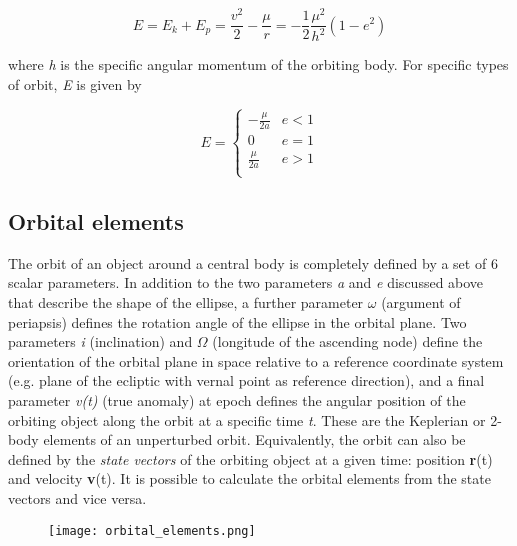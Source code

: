 \documentclass[Orbiter User Manual.tex]{subfiles}
\begin{document}
\[ E = E_{k} + E_{p} = \frac{v^{2}}{2} - \frac{\mu}{r} = - \frac{1}{2} \frac{\mu^{2}}{h^{2}}(1 - e^{2}) \]

\noindent
where \textit{h} is the specific angular momentum of the orbiting body. For specific types of orbit, \textit{E} is given by

\[ E =
\left\{
\begin{array}{ll}
	-\frac{\mu}{2a} & e < 1 \\
	0 & e = 1 \\
	\frac{\mu}{2a} & e > 1 \\
\end{array} 
\right. \]

\subsection{Orbital elements}
The orbit of an object around a central body is completely defined by a set of 6 scalar parameters. In addition to the two parameters \textit{a} and \textit{e} discussed above that describe the shape of the ellipse, a further parameter $\omega$ (argument of periapsis) defines the rotation angle of the ellipse in the orbital plane. Two parameters \textit{i} (inclination) and $\Omega$ (longitude of the ascending node) define the orientation of the orbital plane in space relative to a reference coordinate system (e.g. plane of the ecliptic with vernal point {\Aries} as reference direction), and a final parameter \textit{v(t)} (true anomaly) at epoch defines the angular position of the orbiting object along the orbit at a specific time \textit{t}. These are the Keplerian or 2-body elements of an unperturbed orbit. Equivalently, the orbit can also be defined by the \textit{state vectors} of the orbiting object at a given time: position \textbf{r}(t) and velocity \textbf{v}(t). It is possible to calculate the orbital elements from the state vectors and vice versa.

\begin{figure}[H]
	\centering
	\texttt{[image: orbital\_elements.png]}
\end{figure}
\end{document}
